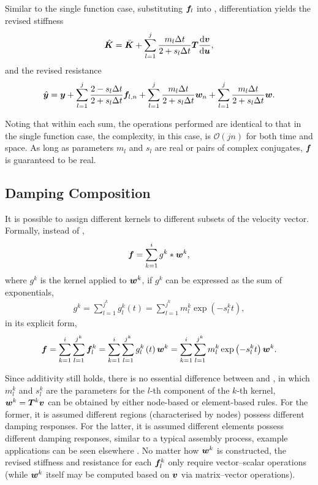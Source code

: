 Similar to the single function case, substituting $\bm{f}_l$ into , differentiation yields the revised stiffness
\begin{gather}\label{eq:revised_k_multi}
\hat{\bm{K}}=\bar{\bm{K}}+\sum_{l=1}^{j}\dfrac{m_l\Delta{}t}{2+s_l\Delta{}t}\bm{T}\dfrac{\mathrm{d}\bm{v}}{\mathrm{d}\bm{u}},
\end{gather}
and the revised resistance
\begin{gather}\label{eq:revised_y_multi}
\hat{\bm{y}}=\bm{y}+\sum_{l=1}^{j}\dfrac{2-s_l\Delta{}t}{2+s_l\Delta{}t}\bm{f}_{l,n}+\sum_{l=1}^{j}\dfrac{m_l\Delta{}t}{2+s_l\Delta{}t}\bm{w}_n+\sum_{l=1}^{j}\dfrac{m_l\Delta{}t}{2+s_l\Delta{}t}\bm{w}.
\end{gather}

Noting that within each sum, the operations performed are identical to that in the single function case, the complexity, in this case, is $\mathcal{O}\left(jn\right)$ for both time and space. As long as parameters $m_l$ and $s_l$ are real or pairs of complex conjugates, $\bm{f}$ is guaranteed to be real.
\subsection{Damping Composition}
It is possible to assign different kernels to different subsets of the velocity vector. Formally, instead of ,
\begin{gather}
\bm{f}=\sum_{k=1}^{i}g^k*\bm{w}^k,
\end{gather}
where $g^k$ is the kernel applied to $\bm{w}^k$, if $g^k$ can be expressed as the sum of exponentials,
\begin{gather}
g^k=\sum_{l=1}^{j^k}g_l^k\left(t\right)=\sum_{l=1}^{j^k}m_l^k\exp\left(-s_l^kt\right),
\end{gather}
in its explicit form,
\begin{gather}\label{eq:composition}
\bm{f}=\sum_{k=1}^{i}\sum_{l=1}^{j^k}\bm{f}_l^k=\sum_{k=1}^{i}\sum_{l=1}^{j^k}g_l^k\left(t\right)\bm{w}^k=\sum_{k=1}^{i}\sum_{l=1}^{j^k}m_l^k\exp\left(-s_l^kt\right)\bm{w}^k.
\end{gather}

Since additivity still holds, there is no essential difference between  and , in which $m_l^k$ and $s_l^k$ are the parameters for the $l$-th component of the $k$-th kernel, $\bm{w}^k=\bm{T}^k\bm{v}$ can be obtained by either node-based or element-based rules. For the former, it is assumed different regions (characterised by nodes) possess different damping responses. For the latter, it is assumed different elements possess different damping responses, similar to a typical assembly process, example applications can be seen elsewhere \citep{Friswell2007}. No matter how $\bm{w}^k$ is constructed, the revised stiffness and resistance for each $\bm{f}_l^k$ only require vector--scalar operations (while $\bm{w}^k$ itself may be computed based on $\bm{v}$ via matrix--vector operations).


